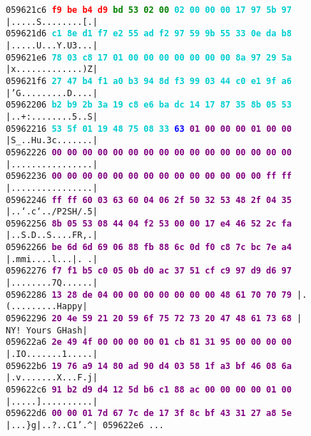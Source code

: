 \documentclass{article}
\begin{document}
\begin{figure}[H]
    \scriptsize{
    \texttt{059621c6  \textbf{\textcolor{red}{f9 be b4 d9} \textcolor{green}{bd 53 02 00}  \textcolor{darkTurquoise}{02 00 00 00 17 97 5b 97}}  |.....S........[.|} \\
    \texttt{059621d6  \textbf{\textcolor{darkTurquoise}{c1 8e d1 f7 e2 55 ad f2  97 59 9b 55 33 0e da b8}}  |.....U...Y.U3...|} \\
    \texttt{059621e6  \textbf{\textcolor{darkTurquoise}{78 03 c8 17 01 00 00 00  00 00 00 00 8a 97 29 5a}}  |x.............)Z|} \\
    \texttt{059621f6  \textbf{\textcolor{darkTurquoise}{27 47 b4 f1 a0 b3 94 8d  f3 99 03 44 c0 e1 9f a6}}  |'G.........D....|} \\
    \texttt{05962206  \textbf{\textcolor{darkTurquoise}{b2 b9 2b 3a 19 c8 e6 ba  dc 14 17 87 35 8b 05 53}}  |..+:........5..S|} \\
    \texttt{05962216  \textbf{\textcolor{darkTurquoise}{53 5f 01 19 48 75 08 33}  \textcolor{blue}{63} \textcolor{purple}{01 00 00 00 01 00 00}}  |S\_..Hu.3c.......|} \\
    \texttt{05962226  \textbf{\textcolor{purple}{00 00 00 00 00 00 00 00  00 00 00 00 00 00 00 00}}  |................|} \\
    \texttt{05962236  \textbf{\textcolor{purple}{00 00 00 00 00 00 00 00  00 00 00 00 00 00 ff ff}}  |................|} \\
    \texttt{05962246  \textbf{\textcolor{purple}{ff ff 60 03 63 60 04 06  2f 50 32 53 48 2f 04 35}}  |..`.c`../P2SH/.5|} \\
    \texttt{05962256  \textbf{\textcolor{purple}{8b 05 53 08 44 04 f2 53  00 00 17 e4 46 52 2c fa}}  |..S.D..S....FR,.|} \\
    \texttt{05962266  \textbf{\textcolor{purple}{be 6d 6d 69 06 88 fb 88  6c 0d f0 c8 7c bc 7e a4}}  |.mmi....l...|.~.|} \\
    \texttt{05962276  \textbf{\textcolor{purple}{f7 f1 b5 c0 05 0b d0 ac  37 51 cf c9 97 d9 d6 97}}  |........7Q......|} \\
    \texttt{05962286  \textbf{\textcolor{purple}{13 28 de 04 00 00 00 00  00 00 00 48 61 70 70 79}}  |.(.........Happy|} \\
    \texttt{05962296  \textbf{\textcolor{purple}{20 4e 59 21 20 59 6f 75  72 73 20 47 48 61 73 68}}  | NY! Yours GHash|} \\
    \texttt{059622a6  \textbf{\textcolor{purple}{2e 49 4f 00 00 00 00 01  cb 81 31 95 00 00 00 00}}  |.IO.......1.....|} \\
    \texttt{059622b6  \textbf{\textcolor{purple}{19 76 a9 14 80 ad 90 d4  03 58 1f a3 bf 46 08 6a}}  |.v.......X...F.j|} \\
    \texttt{059622c6  \textbf{\textcolor{purple}{91 b2 d9 d4 12 5d b6 c1  88 ac 00 00 00 00 01 00}}  |.....]..........|} \\
    \texttt{059622d6  \textbf{\textcolor{purple}{00 00 01 7d 67 7c de 17  3f 8c bf 43 31 27 a8 5e}}  |...\}g|..?..C1'.\textasciicircum|
    \texttt{059622e6} ...}
    }
    \end{figure}
\end{document}
